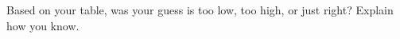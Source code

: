 \documentclass[handout,space,nooutcomes]{ximera}
\begin{document}
\begin{question}[1in]
\end{question}

\begin{question}
Based on your table, was your guess is too low, too high, or just
right?  Explain how you know. 
\begin{multipleChoice}
\end{multipleChoice}
\vfill

\end{question}
%
%
%
\end{document}
